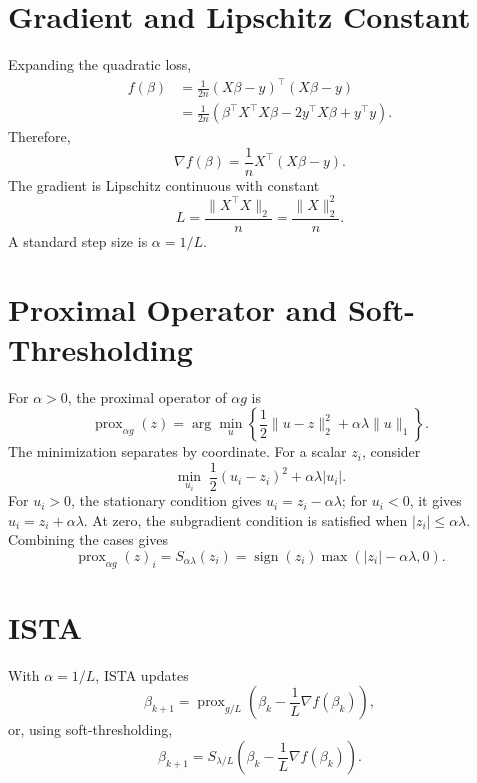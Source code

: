 \documentclass[11pt]{article}
\begin{document}
\section{Gradient and Lipschitz Constant}
Expanding the quadratic loss,
\begin{align}
f(\beta)
&=\frac{1}{2n}(X\beta-y)^\top(X\beta-y)\\
&=\frac{1}{2n}\left(\beta^\top X^\top X\beta
-2y^\top X\beta+y^\top y\right).
\end{align}
Therefore,
\begin{equation}
\nabla f(\beta)=\frac{1}{n}X^\top(X\beta-y).
\label{eq:gradient}
\end{equation}
The gradient is Lipschitz continuous with constant
\begin{equation}
L=\frac{\|X^\top X\|_2}{n}=\frac{\|X\|_2^2}{n}.
\label{eq:lipschitz}
\end{equation}
A standard step size is $\alpha=1/L$.

\section{Proximal Operator and Soft-Thresholding}
For $\alpha>0$, the proximal operator of $\alpha g$ is
\begin{equation}
\operatorname{prox}_{\alpha g}(z)
=\arg\min_u\left\{\frac{1}{2}\|u-z\|_2^2+
\alpha\lambda\|u\|_1\right\}.
\end{equation}
The minimization separates by coordinate. For a scalar $z_i$, consider
\begin{equation}
\min_{u_i}\;\frac{1}{2}(u_i-z_i)^2+\alpha\lambda|u_i|.
\end{equation}
For $u_i>0$, the stationary condition gives $u_i=z_i-\alpha\lambda$;
for $u_i<0$, it gives $u_i=z_i+\alpha\lambda$. At zero, the subgradient
condition is satisfied when $|z_i|\leq\alpha\lambda$. Combining the cases gives
\begin{equation}
\operatorname{prox}_{\alpha g}(z)_i
=S_{\alpha\lambda}(z_i)
=\operatorname{sign}(z_i)\max(|z_i|-\alpha\lambda,0).
\label{eq:soft}
\end{equation}

\section{ISTA}
With $\alpha=1/L$, ISTA updates
\begin{equation}
\beta_{k+1}=
\operatorname{prox}_{g/L}\left(\beta_k-\frac{1}{L}\nabla f(\beta_k)\right),
\end{equation}
or, using soft-thresholding,
\begin{equation}
\beta_{k+1}=
S_{\lambda/L}\left(\beta_k-\frac{1}{L}\nabla f(\beta_k)\right).
\end{equation}
\end{document}
